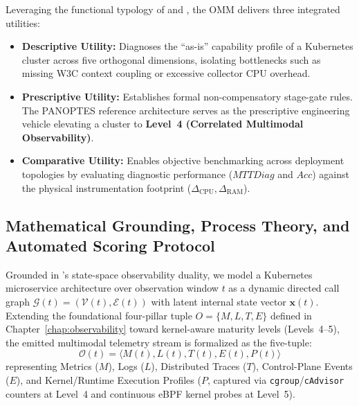 

Leveraging the functional typology of  and , the OMM delivers three integrated utilities:
\begin{itemize}
    \item \textbf{Descriptive Utility:} Diagnoses the ``as-is'' capability profile of a Kubernetes cluster across five orthogonal dimensions, isolating bottlenecks such as missing W3C context coupling or excessive collector CPU overhead.
    \item \textbf{Prescriptive Utility:} Establishes formal non-compensatory stage-gate rules. The PANOPTES reference architecture serves as the prescriptive engineering vehicle elevating a cluster to \textbf{Level~4 (Correlated Multimodal Observability)}.
    \item \textbf{Comparative Utility:} Enables objective benchmarking across deployment topologies by evaluating diagnostic performance ($MTTDiag$ and $Acc$) against the physical instrumentation footprint ($\Delta_{\text{CPU}}, \Delta_{\text{RAM}}$).
\end{itemize}

\subsection{Mathematical Grounding, Process Theory, and Automated Scoring Protocol}
\label{subsec:omm-math-formalization}

Grounded in 's state-space observability duality, we model a Kubernetes microservice architecture over observation window $t$ as a dynamic directed call graph $\mathcal{G}(t) = (\mathcal{V}(t), \mathcal{E}(t))$ with latent internal state vector $\mathbf{x}(t)$. Extending the foundational four-pillar tuple $O = \{M, L, T, E\}$ defined in Chapter~\ref{chap:observability} toward kernel-aware maturity levels (Levels~4--5), the emitted multimodal telemetry stream is formalized as the five-tuple:
\begin{equation}
    \mathcal{O}(t) = \langle M(t), L(t), T(t), E(t), P(t) \rangle
    \label{eq:omm_telemetry_tuple}
\end{equation}
representing Metrics ($M$), Logs ($L$), Distributed Traces ($T$), Control-Plane Events ($E$), and Kernel/Runtime Execution Profiles ($P$, captured via \texttt{cgroup}/\texttt{cAdvisor} counters at Level~4 and continuous eBPF kernel probes at Level~5).


